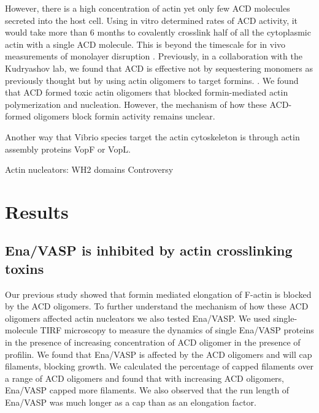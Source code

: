 However, there is a high concentration of actin yet only few ACD molecules secreted into the host cell. Using in vitro determined rates of ACD activity, it would take more than 6 months to covalently crosslink half of all the cytoplasmic actin with a single ACD molecule. This is beyond the timescale for in vivo measurements of monolayer disruption \citep{}. Previously, in a collaboration with the Kudryashov lab, we found that ACD is effective not by sequestering monomers as previously thought but by using actin oligomers to target formins. \citep{heisler_acd_2015}. We found that ACD formed toxic actin oligomers that blocked formin-mediated actin polymerization and nucleation. However, the mechanism of how these ACD-formed oligomers block formin activity remains unclear. 

Another way that Vibrio species target the actin cytoskeleton is through actin assembly proteins VopF or VopL. \citep{burke_bacterial_2017}

Actin nucleators: WH2 domains
	Controversy

\section{Results}\label{ch04-results}

\subsection{Ena/VASP is inhibited by actin crosslinking toxins}\label{ena-acd-oligomers}
Our previous study showed that formin mediated elongation of F-actin is blocked by the ACD oligomers. To further understand the mechanism of how these ACD oligomers affected actin nucleators we also tested Ena/VASP. We used single-molecule TIRF microscopy to measure the dynamics of single Ena/VASP proteins in the presence of increasing concentration of ACD oligomer in the presence of profilin. We found that Ena/VASP is affected by the ACD oligomers and will cap filaments, blocking growth. We calculated the percentage of capped filaments over a range of ACD oligomers and found that with increasing ACD oligomers, Ena/VASP capped more filaments. We also observed that the run length of Ena/VASP was much longer as a cap than as an elongation factor. 

